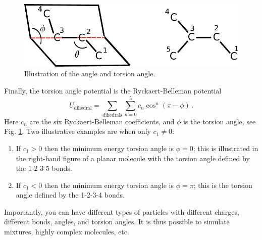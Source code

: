 \documentclass[11pt]{article}
\begin{document}
\begin{figure}[h]
  \begin{center}
    \includegraphics[scale=.7]{diheadral.pdf}
  \caption{
    \label{fig:torsion}
    Illustration of the angle and torsion angle.
  }
  \end{center}
\end{figure}

Finally, the torsion angle potential is the Ryckaert-Belleman potential 
\begin{equation}
  U_\mathrm{dihedral}=\sum_{\mathrm{dihedrals}} \sum_{n=0}^5 c_n
  \cos^n(\pi-\phi)
   \, . 
\end{equation}
Here $c_n$ are the six Ryckaert-Belleman coefficients, and $\phi$ is the
torsion angle, see Fig. \ref{fig:torsion}. Two illustrative 
examples are when only $c_1 \neq 0$:
\begin{enumerate}
\item If $c_1 > 0$ then the minimum energy torsion angle is $\phi = 0$; this is
  illustrated in the right-hand figure of a planar molecule with the torsion
  angle defined by the 1-2-3-5 bonds. 
\item If $c_1 < 0$ then the minimum energy torsion angle is $\phi = \pi$; this
  is the torsion angle defined by the 1-2-3-4 bonds. 
\end{enumerate}

Importantly, you can have different types of particles with different charges,
different bonds, angles, and torsion angles. It is thus possible to simulate
mixtures, highly complex molecules, etc.
\end{document}
